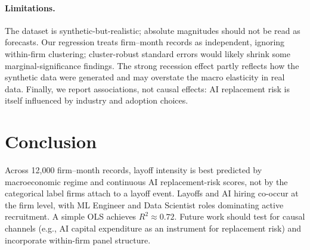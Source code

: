\documentclass[11pt]{article}
\begin{document}
\paragraph{Limitations.}
The dataset is synthetic-but-realistic; absolute magnitudes should not be read as forecasts. Our regression treats firm--month records as independent, ignoring within-firm clustering; cluster-robust standard errors would likely shrink some marginal-significance findings. The strong recession effect partly reflects how the synthetic data were generated and may overstate the macro elasticity in real data. Finally, we report associations, not causal effects: AI replacement risk is itself influenced by industry and adoption choices.

\section{Conclusion}
Across 12{,}000 firm--month records, layoff intensity is best predicted by macroeconomic regime and continuous AI replacement-risk scores, not by the categorical label firms attach to a layoff event. Layoffs and AI hiring co-occur at the firm level, with ML Engineer and Data Scientist roles dominating active recruitment. A simple OLS achieves $R^2 \approx 0.72$. Future work should test for causal channels (e.g., AI capital expenditure as an instrument for replacement risk) and incorporate within-firm panel structure.
\end{document}
